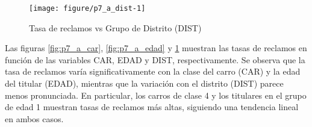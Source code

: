 \documentclass[paper=letter, fontsize=11pt]{scrartcl}\usepackage[]{graphicx}\usepackage[]{xcolor}
\makeatletter
\def\maxwidth{ %
  \ifdim\Gin@nat@width>\linewidth
    \linewidth
  \else
    \Gin@nat@width
  \fi
}
\newenvironment{knitrout}{}{} %
\numberwithin{equation}{problemcounter} %
\numberwithin{figure}{problemcounter} %
\numberwithin{table}{problemcounter} %
\numberwithin{subsection}{problemcounter}
\makeatother
\begin{document}
\begin{knitrout}
\color{fgcolor}\begin{figure}[H]

{\centering \texttt{[image: figure/p7\_a\_dist-1]} 

}

\caption[Tasa de reclamos vs Grupo de Distrito (DIST)]{Tasa de reclamos vs Grupo de Distrito (DIST)}\label{fig:p7_a_dist}
\end{figure}

\end{knitrout}

Las figuras \ref{fig:p7_a_car}, \ref{fig:p7_a_edad} y \ref{fig:p7_a_dist} muestran las tasas de reclamos en función de las variables CAR, EDAD y DIST, respectivamente. Se observa que la tasa de reclamos varía significativamente con la clase del carro (CAR) y la edad del titular (EDAD), mientras que la variación con el distrito (DIST) parece menos pronunciada. En particular, los carros de clase 4 y los titulares en el grupo de edad 1 muestran tasas de reclamos más altas, siguiendo una tendencia lineal en ambos casos.
\end{document}
